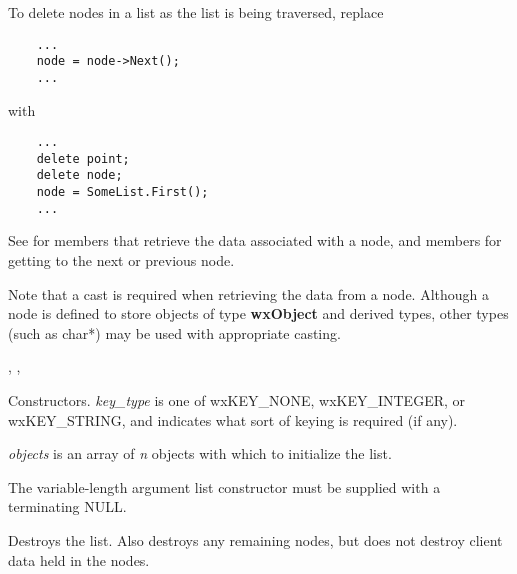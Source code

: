 To delete nodes in a list as the list is being traversed, replace

\begin{verbatim}
    ...
    node = node->Next();
    ...
\end{verbatim}

with

\begin{verbatim}
    ...
    delete point;
    delete node;
    node = SomeList.First();
    ...
\end{verbatim}

See  for members that retrieve the data associated with a node, and
members for getting to the next or previous node.

Note that a cast is required when retrieving the data from a node.  Although a
node is defined to store objects of type {\bf wxObject} and derived types, other
types (such as char*) may be used with appropriate casting.


, ,







Constructors. {\it key\_type} is one of wxKEY\_NONE, wxKEY\_INTEGER, or wxKEY\_STRING,
and indicates what sort of keying is required (if any).

{\it objects} is an array of {\it n} objects with which to initialize the list.

The variable-length argument list constructor must be supplied with a
terminating NULL.



Destroys the list.  Also destroys any remaining nodes, but does not destroy
client data held in the nodes.



